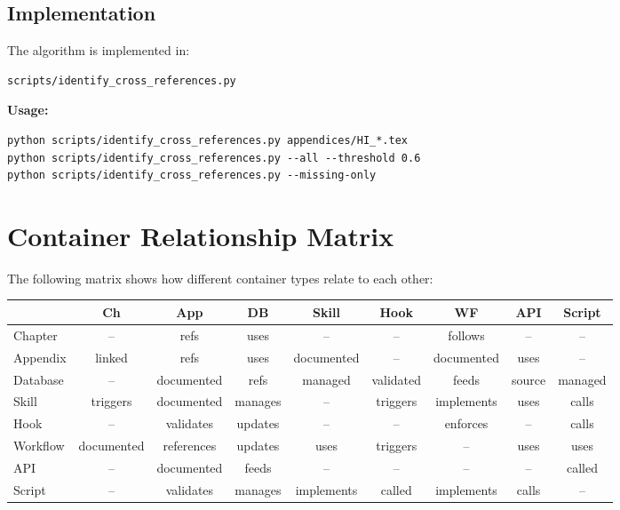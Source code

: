 \subsection{Implementation}

The algorithm is implemented in:

\begin{verbatim}
scripts/identify_cross_references.py
\end{verbatim}

\textbf{Usage:}
\begin{verbatim}
python scripts/identify_cross_references.py appendices/HI_*.tex
python scripts/identify_cross_references.py --all --threshold 0.6
python scripts/identify_cross_references.py --missing-only
\end{verbatim}


\section{Container Relationship Matrix}
\label{sec:bo-relationships}

The following matrix shows how different container types relate to each other:

\begin{center}
\small
\begin{tabular}{|l|c|c|c|c|c|c|c|c|}
\hline
& Ch & App & DB & Skill & Hook & WF & API & Script \\
\hline
Chapter & -- & refs & uses & -- & -- & follows & -- & -- \\
Appendix & linked & refs & uses & documented & -- & documented & uses & -- \\
Database & -- & documented & refs & managed & validated & feeds & source & managed \\
Skill & triggers & documented & manages & -- & triggers & implements & uses & calls \\
Hook & -- & validates & updates & -- & -- & enforces & -- & calls \\
Workflow & documented & references & updates & uses & triggers & -- & uses & uses \\
API & -- & documented & feeds & -- & -- & -- & -- & called \\
Script & -- & validates & manages & implements & called & implements & calls & -- \\
\hline
\end{tabular}
\end{center}


